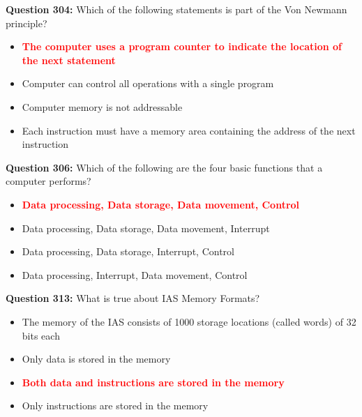 \documentclass[12pt,a4paper]{article}
\begin{document}
\vspace{0.5cm}

\vspace{0.5cm}

\textbf{Question 304:} Which of the following statements is part of the Von Newmann principle?

\begin{itemize}
    \item[\textbf{A.}] \textcolor{red}{\textbf{The computer uses a program counter to indicate the location of the next statement}}
    \item[\textbf{B.}] Computer can control all operations with a single program
    \item[\textbf{C.}] Computer memory is not addressable
    \item[\textbf{D.}] Each instruction must have a memory area containing the address of the next instruction
\end{itemize}

\vspace{0.5cm}

\vspace{0.5cm}

\textbf{Question 306:} Which of the following are the four basic functions that a computer performs?

\begin{itemize}
    \item[\textbf{A.}] \textcolor{red}{\textbf{Data processing, Data storage, Data movement, Control}}
    \item[\textbf{B.}] Data processing, Data storage, Data movement, Interrupt
    \item[\textbf{C.}] Data processing, Data storage, Interrupt, Control
    \item[\textbf{D.}] Data processing, Interrupt, Data movement, Control
\end{itemize}

\vspace{0.5cm}

\vspace{0.5cm}

\textbf{Question 313:} What is true about IAS Memory Formats?

\begin{itemize}
    \item[\textbf{A.}] The memory of the IAS consists of 1000 storage locations (called words) of 32 bits each
    \item[\textbf{B.}] Only data is stored in the memory
    \item[\textbf{C.}] \textcolor{red}{\textbf{Both data and instructions are stored in the memory}}
    \item[\textbf{D.}] Only instructions are stored in the memory
\end{itemize}
\end{document}
